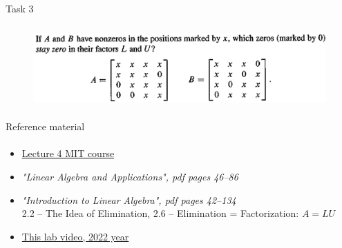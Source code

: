 \documentclass[aspectratio=169]{beamer}
\begin{document}
\begin{frame}[t]{Task 3}
    \framesubtitle{}
    \begin{figure}[H]
        \centering\includegraphics[height=3cm,width=1\textwidth,keepaspectratio]{3.png}
        \label{fig:3.png}
    \end{figure}
\end{frame}

\begin{frame}[t]{Reference material}
    \framesubtitle{}
    \Large
    \begin{itemize}
        \item \href{https://ocw.mit.edu/courses/mathematics/18-06-linear-algebra-spring-2010/video-lectures/lecture-4-factorization-into-a-lu/}{Lecture 4 MIT course}
        \item \textit{"Linear Algebra and Applications", pdf pages 46--86 }
        \item \textit{"Introduction to Linear Algebra", pdf pages 42--134 }\\  2.2 -- The Idea of Elimination, 2.6 -- Elimination = Factorization: $A=LU$
        \item \href{https://youtu.be/OJPX6wINxBU}{This lab video, 2022 year}
    \end{itemize}
\end{frame}
\end{document}
